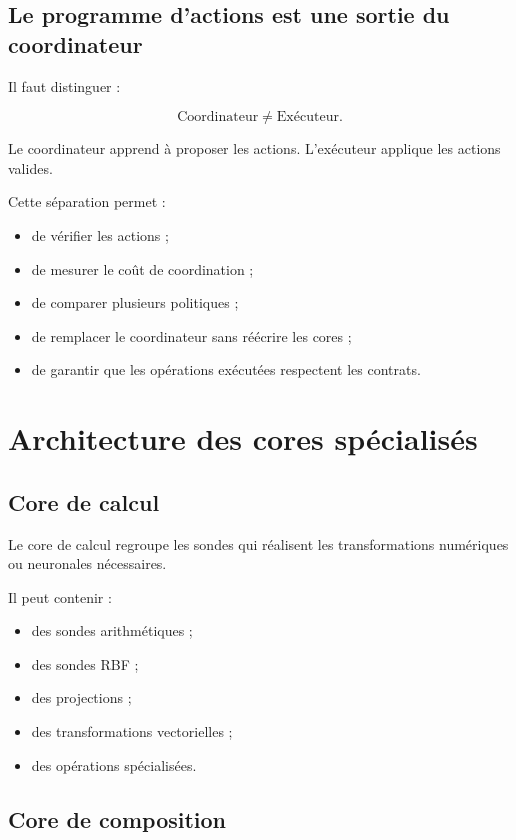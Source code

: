 \documentclass[11pt,a4paper]{article}
\begin{document}
\subsection{Le programme d'actions est une sortie du coordinateur}

Il faut distinguer :

\[
\text{Coordinateur}
\neq
\text{Exécuteur}.
\]

Le coordinateur apprend à proposer les actions.
L'exécuteur applique les actions valides.

Cette séparation permet :
\begin{itemize}
  \item de vérifier les actions ;
  \item de mesurer le coût de coordination ;
  \item de comparer plusieurs politiques ;
  \item de remplacer le coordinateur sans réécrire les cores ;
  \item de garantir que les opérations exécutées respectent les contrats.
\end{itemize}

\section{Architecture des cores spécialisés}

\subsection{Core de calcul}

Le core de calcul regroupe les sondes qui réalisent les transformations
numériques ou neuronales nécessaires.

Il peut contenir :
\begin{itemize}
  \item des sondes arithmétiques ;
  \item des sondes RBF ;
  \item des projections ;
  \item des transformations vectorielles ;
  \item des opérations spécialisées.
\end{itemize}

\subsection{Core de composition}
\end{document}
